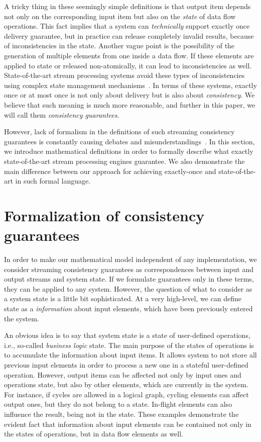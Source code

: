 \documentclass[sigconf]{acmart}
\theoremstyle{remark}
\begin{document}
A tricky thing in these seemingly simple definitions is that output item depends not only on the corresponding input item but also on the {\em state} of data flow operations. This fact implies that a system can {\em technically} support exactly once delivery guarantee, but in practice can release completely invalid results, because of inconsistencies in the state. Another vague point is the possibility of the generation of multiple elements from one inside a data flow. If these elements are applied to state or released non-atomically, it can lead to inconsistencies as well. State-of-the-art stream processing systems avoid these types of inconsistencies using complex state management mechanisms~\cite{Carbone:2017:SMA:3137765.3137777}. In terms of these systems, exactly once or at most once is not only about delivery but is also about {\em consistency}. We believe that such meaning is much more reasonable, and further in this paper, we will call them {\em consistency guarantees}.   

However, lack of formalism in the definitions of such streaming consistency guarantees is constantly causing debates and misunderstandings~\cite{JerryPengStreamIO, PaperTrail}. In this section, we introduce mathematical definitions in order to formally describe what exactly state-of-the-art stream processing engines guarantee. We also demonstrate the main difference between our approach for achieving exactly-once and state-of-the-art in such formal language.     

\section{Formalization of consistency guarantees}

In order to make our mathematical model independent of any implementation, we consider streaming consistency guarantees as correspondences between input and output streams and system state. If we formulate guarantees only in these terms, they can be applied to any system. However, the question of what to consider as a system state is a little bit sophisticated. At a very high-level, we can define state as a {\em information} about input elements, which have been previously entered the system.  

An obvious idea is to say that system state is a state of user-defined operations, i.e., so-called {\em business logic} state. The main purpose of the states of operations is to accumulate the information about input items. It allows system to not store all previous input elements in order to process a new one in a stateful user-defined operation. However, output items can be affected not only by input ones and operations state, but also by other elements, which are currently in the system. For instance, if cycles are allowed in a logical graph, cycling elements can affect output ones, but they do not belong to a state. In-flight elements can also influence the result, being not in the state. These examples demonstrate the evident fact that information about input elements can be contained not only in the states of operations, but in data flow elements as well.
\end{document}
